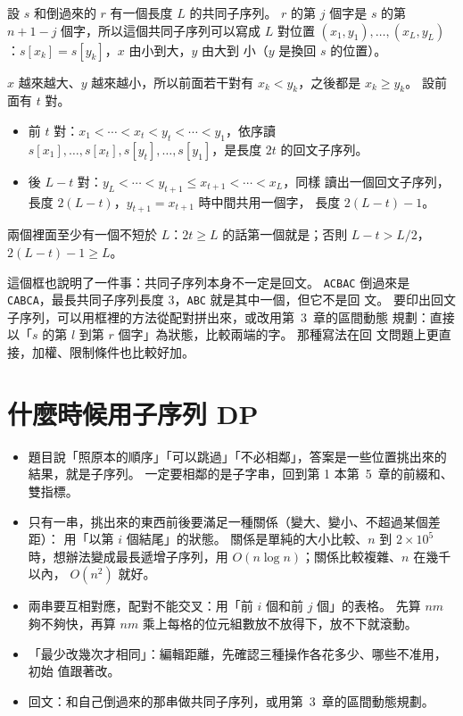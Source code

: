 \begin{whybox}
設 $s$ 和倒過來的 $r$ 有一個長度 $L$ 的共同子序列。 $r$ 的第 $j$ 個字是 $s$
的第 $n + 1 - j$ 個字，所以這個共同子序列可以寫成 $L$ 對位置
$(x_1, y_1), \ldots, (x_L, y_L)$：$s[x_k] = s[y_k]$，$x$ 由小到大，$y$ 由大到
小（$y$ 是換回 $s$ 的位置）。

$x$ 越來越大、$y$ 越來越小，所以前面若干對有 $x_k < y_k$，之後都是
$x_k \ge y_k$。 設前面有 $t$ 對。
\begin{itemize}
\item 前 $t$ 對：$x_1 < \cdots < x_t < y_t < \cdots < y_1$，依序讀
$s[x_1], \ldots, s[x_t], s[y_t], \ldots, s[y_1]$，是長度 $2t$ 的回文子序列。
\item 後 $L - t$ 對：$y_L < \cdots < y_{t+1} \le x_{t+1} < \cdots < x_L$，同樣
讀出一個回文子序列，長度 $2(L - t)$，$y_{t+1} = x_{t+1}$ 時中間共用一個字，
長度 $2(L - t) - 1$。
\end{itemize}
兩個裡面至少有一個不短於 $L$：$2t \ge L$ 的話第一個就是；否則 $L - t > L / 2$，
$2(L - t) - 1 \ge L$。
\end{whybox}

這個框也說明了一件事：共同子序列本身不一定是回文。 \texttt{ACBAC} 倒過來是
\texttt{CABCA}，最長共同子序列長度 $3$，\texttt{ABC} 就是其中一個，但它不是回
文。 要印出回文子序列，可以用框裡的方法從配對拼出來，或改用第~3~章的區間動態
規劃：直接以「$s$ 的第 $l$ 到第 $r$ 個字」為狀態，比較兩端的字。 那種寫法在回
文問題上更直接，加權、限制條件也比較好加。

\section{什麼時候用子序列 DP}
\label{sec:ss-when}

\begin{itemize}
\item 題目說「照原本的順序」「可以跳過」「不必相鄰」，答案是一些位置挑出來的
結果，就是子序列。 一定要相鄰的是子字串，回到第 1 本第~5~章的前綴和、雙指標。
\item 只有一串，挑出來的東西前後要滿足一種關係（變大、變小、不超過某個差距）：
用「以第 $i$ 個結尾」的狀態。 關係是單純的大小比較、$n$ 到 $2 \times 10^5$
時，想辦法變成最長遞增子序列，用 $O(n \log n)$；關係比較複雜、$n$ 在幾千以內，
$O(n^2)$ 就好。
\item 兩串要互相對應，配對不能交叉：用「前 $i$ 個和前 $j$ 個」的表格。 先算
$nm$ 夠不夠快，再算 $nm$ 乘上每格的位元組數放不放得下，放不下就滾動。
\item 「最少改幾次才相同」：編輯距離，先確認三種操作各花多少、哪些不准用，初始
值跟著改。
\item 回文：和自己倒過來的那串做共同子序列，或用第~3~章的區間動態規劃。
\end{itemize}

